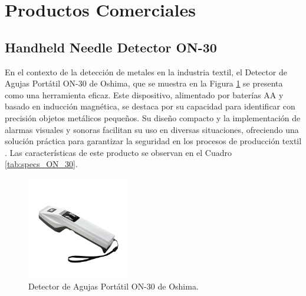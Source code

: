 \section{Productos Comerciales}

\subsection{Handheld Needle Detector ON-30}

En el contexto de la detección de metales en la industria textil, el Detector de Agujas Portátil ON-30 de Oshima, que se muestra en la Figura \ref{fig:oshima_on_30} se presenta como una herramienta eficaz. Este dispositivo, alimentado por baterías AA y basado en inducción magnética, se destaca por su capacidad para identificar con precisión objetos metálicos pequeños. Su diseño compacto y la implementación de alarmas visuales y sonoras facilitan su uso en diversas situaciones, ofreciendo una solución práctica para garantizar la seguridad en los procesos de producción textil \cite{oshimaEfficientHandheld}. Las características de este producto se observan en el Cuadro \ref{tab:specs_ON_30}.

\begin{figure}[H]
	\centering
	\includegraphics[width=0.4\textwidth]{img/oshima_on_30.png}
	\caption{Detector de Agujas Portátil ON-30 de Oshima.}
	\label{fig:oshima_on_30}
\end{figure}

